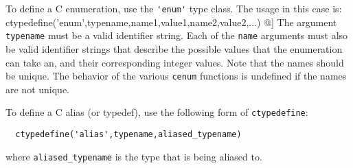 To define a C enumeration, use the \verb|'enum'| type class.  The usage
in this case is:
  ctypedefine('enum',typename,name1,value1,name2,value2,...)
@]
The argument \verb|typename| must be a valid identifier string.  Each of the
\verb|name| arguments must also be valid identifier strings that describe
the possible values that the enumeration can take an, and their corresponding
integer values.  Note that the names should be unique.  The behavior of
the various \verb|cenum| functions is undefined if the names are not unique.

To define a C alias (or typedef), use the following form of \verb|ctypedefine|:
\begin{verbatim}
  ctypedefine('alias',typename,aliased_typename)
\end{verbatim}
where \verb|aliased_typename| is the type that is being aliased to.
